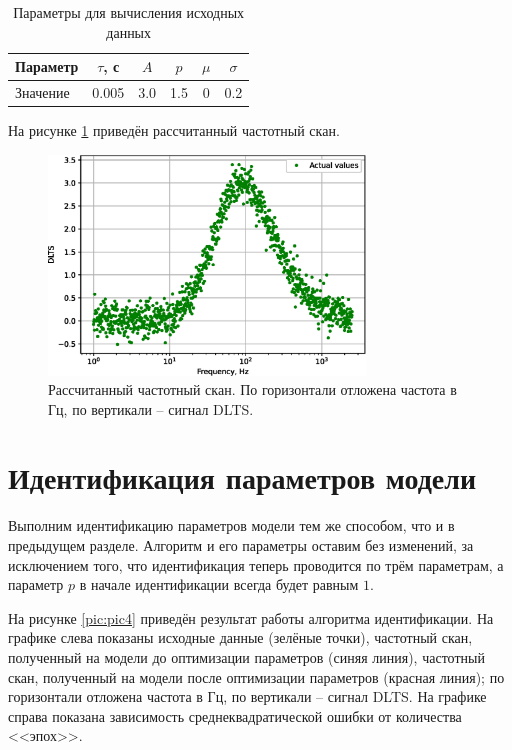 \documentclass{report}
\begin{document}
        \begin{table}[ht]
            \caption{Параметры для вычисления исходных данных}
            \label{table:table5}
            \centering
            \begin{tabular}{ | l | c | c | c | c | c |}
                \hline
                Параметр & $\tau$, с & $A$ & $p$ & $\mu$ & $\sigma$ \\
                \hline
                Значение & 0.005 & 3.0 & 1.5 & 0 & 0.2 \\
                \hline
            \end{tabular}
        \end{table}

        На рисунке \ref{pic:pic3} приведён рассчитанный частотный скан.

        \begin{figure}[ht]
            \centering
            \includegraphics[width=0.75\textwidth]{p_experimental_data}
            \caption{Рассчитанный частотный скан. По горизонтали отложена 
            частота в Гц, по вертикали -- сигнал DLTS.}
            \label{pic:pic3}
        \end{figure}

        \section{Идентификация параметров модели}
        Выполним идентификацию параметров модели тем же способом, что и 
        в предыдущем разделе. Алгоритм и его параметры оставим без изменений, 
        за исключением того, что идентификация теперь проводится по трём 
        параметрам, а параметр $p$ в начале идентификации всегда будет равным $1$.

        На рисунке \ref{pic:pic4} приведён результат работы алгоритма идентификации.
        На графике слева показаны исходные данные (зелёные точки), частотный скан, 
        полученный на модели до оптимизации параметров (синяя линия), частотный скан, 
        полученный на модели после оптимизации параметров (красная линия); по 
        горизонтали отложена частота в Гц, по вертикали – сигнал DLTS. На графике 
        справа показана зависимость среднеквадратической ошибки от количества <<эпох>>.
\end{document}
